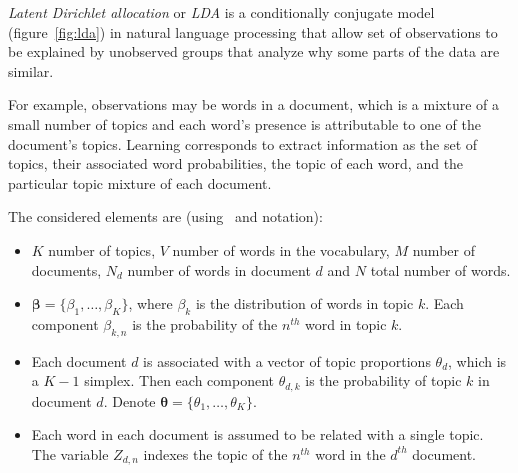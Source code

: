 
\emph{Latent Dirichlet allocation} or \emph{LDA} is a conditionally conjugate model (figure~\ref{fig:lda}) in natural language processing that allow set of observations to be explained by unobserved groups that analyze why some parts of the data are similar.

For example, observations may be words in a document, which is a mixture of a small number of topics and each word's presence is attributable to one of the document's topics. Learning corresponds to extract information as the set of topics, their associated word probabilities, the topic of each word, and the particular topic mixture of each document.

The considered elements are (using~\cite{hoffman2013stochastic} and \cite{blei2003latent} notation):
\begin{itemize}\setlength\itemsep{1em}
  \item \(K\) number of topics, \(V\) number of words in the vocabulary, \(M\) number of documents, \(N_{d}\) number of words in document \(d\) and \(N\) total number of words.
  \item \(\bm{\beta} = \{\beta_{1}, \dots, \beta_{K}\}\), where \(\beta_{k}\) is the distribution of words in topic \(k\). Each component \(\beta_{k,n}\) is the probability of the \(n^{th}\) word in topic \(k\).

  \item Each document \(d\) is associated with a vector of topic proportions \(\theta_{d}\), which is a \(K-1\) simplex. Then each component \(\theta_{d,k}\) is the probability of topic \(k\) in document \(d\). Denote \(\bm{\theta} = \{\theta_{1},\dots,\theta_{K}\}\).
  \item Each word in each document is assumed to be related with a single topic. The variable \(Z_{d,n}\) indexes the topic of the \(n^{th}\) word in the \(d^{th}\) document.
\end{itemize}

